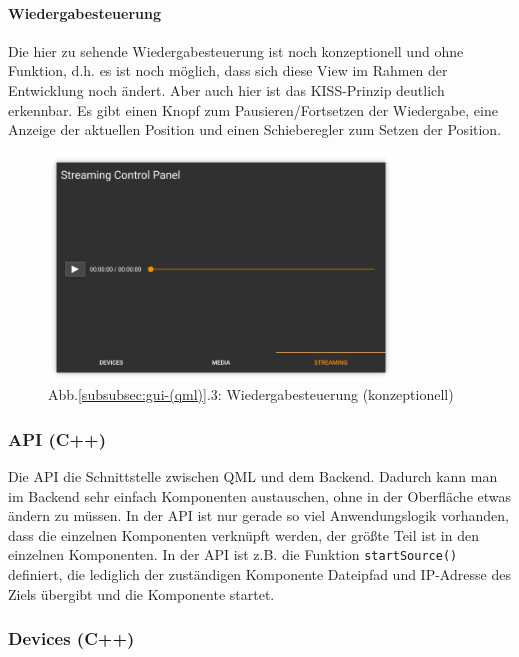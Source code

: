 \documentclass{article}
\begin{document}
    \newpage

    \paragraph{Wiedergabesteuerung}
    Die hier zu sehende Wiedergabesteuerung ist noch konzeptionell und ohne Funktion, d.h. es ist noch möglich, dass sich diese View im Rahmen der Entwicklung noch ändert.
    Aber auch hier ist das KISS-Prinzip deutlich erkennbar.
    Es gibt einen Knopf zum Pausieren/Fortsetzen der Wiedergabe,
    eine Anzeige der aktuellen Position und einen Schieberegler zum Setzen der Position.
    \begin{figure} [!ht]
        \centering
        \includegraphics[height=6cm]{Streaming.png}
        \caption*{Abb.\ref{subsubsec:gui-(qml)}.3: Wiedergabesteuerung (konzeptionell)}
    \end{figure}

    \subsubsection{API (C++)}\label{subsubsec:api-(c++)}
    Die API die Schnittstelle zwischen QML und dem Backend.
    Dadurch kann man im Backend sehr einfach Komponenten austauschen, ohne in der Oberfläche etwas ändern zu müssen.
    In der API ist nur gerade so viel Anwendungslogik vorhanden, dass die einzelnen Komponenten verknüpft werden,
    der größte Teil ist in den einzelnen Komponenten.
    In der API ist z.B. die Funktion \texttt{startSource()} definiert,
    die lediglich der zuständigen Komponente Dateipfad und IP-Adresse des Ziels übergibt und die Komponente startet.

    \subsubsection{Devices (C++)}\label{subsubsec:devices-(c++)}
\end{document}

